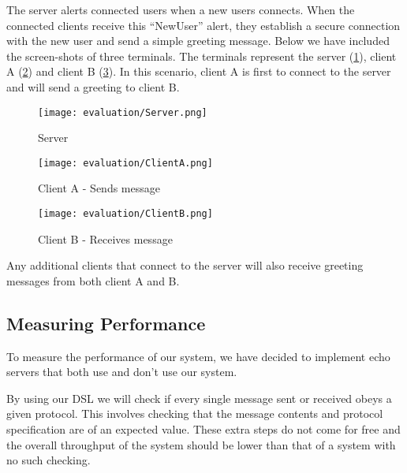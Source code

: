 The server alerts connected users when a new users connects. When the connected clients receive this ``NewUser'' alert, they establish a secure connection with the new user and send a simple greeting message. Below we have included the screen-shots of three terminals. The terminals represent the server (\ref{fig:server}), client A (\ref{fig:clienta}) and client B (\ref{fig:clientb}). In this scenario, client A is first to connect to the server and will send a greeting to client B.

\begin{figure}[H]
  \centering
  \texttt{[image: evaluation/Server.png]}
  \caption{Server}
  \label{fig:server}
\end{figure}

\begin{figure}[H]
  \centering
  \texttt{[image: evaluation/ClientA.png]}
  \caption{Client A - Sends message}
  \label{fig:clienta}
\end{figure}

\begin{figure}[H]
  \centering
  \texttt{[image: evaluation/ClientB.png]}
  \caption{Client B - Receives message}
  \label{fig:clientb}
\end{figure}

Any additional clients that connect to the server will also receive greeting messages from both client A and B.





\subsection{Measuring Performance}
To measure the performance of our system, we have decided to implement echo servers that both use and don't use our system.

By using our DSL we will check if every single message sent or received obeys a given protocol. This involves checking that the message contents and protocol specification are of an expected value. These extra steps do not come for free and the overall throughput of the system should be lower than that of a system with no such checking. 

